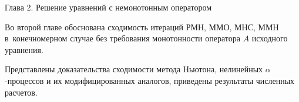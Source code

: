 \documentclass[10pt,pdf, mathserif, hyperref={unicode}]{beamer}
\begin{document}

\begin{frame}{Глава 2. Решение уравнений с немонотонным оператором}
	
	Во второй главе обоснована сходимость итераций РМН, ММО, МНС, ММН в~конечномерном случае без требования монотонности оператора $A$ исходного уравнения.
	
	\smallskip
	Представлены доказательства сходимости метода Ньютона, нелинейных $\alpha$-процессов и их модифицированных аналогов, приведены результаты численных расчетов.
\end{frame}

 
\end{document}

